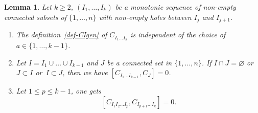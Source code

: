 \documentclass[pdftex]{sigma}
\numberwithin{equation}{section}
\newtheorem{lemm}[theo]{Lemma}
\theoremstyle{definition}
\begin{document}
\begin{lemm}\label{lem:Commg}
 Let $k\geq 2$, $(I_1,\dots, I_k)$ be a monotonic sequence of non-empty connected subsets of $\{1,\dots,n\}$ with non-empty holes between $I_{j}$ and $I_{j+1}$.
\begin{enumerate}\itemsep=0pt
\item[$1.$] The definition~\eqref{def-CIgen} of $C_{I_1\dots I_k}$ is independent of the choice of $a\in\{1,\dots,k-1\}$.
\item[$2.$] Let $I=I_1 \cup \dots \cup I_{k-1}$ and $J$ be a connected set in $\{1,\dots,n\}$.
If $I\cap J=\varnothing$ or $J\subset I$ or~$I\subset J$, then we have $[C_{I_1\dots I_{k-1} },C_J]=0$.
\item[$3.$]
Let $1\leq p \leq k-1$, one gets
\begin{equation}\label{eq:com4}
 [C_{I_1I_2\dots I_p} , C_{I_{p+1}\dots I_{k}}]=0 .
\end{equation}
\end{enumerate}
\end{lemm}
\end{document}
